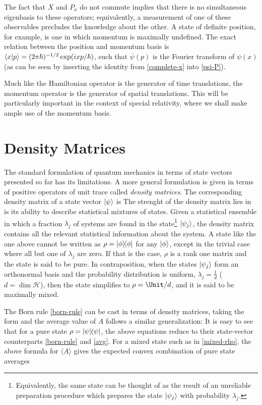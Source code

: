 \documentclass[12pt,a4paper,notitlepage]{report}
\begin{document}
The fact that $X$ and $P_x$ do not commute implies that there is no simultaneous eigenbasis to these operators; equivalently, a measurement of one of these observables precludes the knowledge about the other. A state of definite position, for example, is one in which momentum is maximally undefined. The exact relation between the position and momentum basis is $\bra{x}\ket{p} = (2\pi\hbar)^{-1/2} \exp(i x p/\hbar)$, such that $\overbar{\psi}(p)$ is the Fourier transform of $\psi(x)$ (as can be seen by inserting the identity from \eqref{complete-x} into \eqref{psi-P}).

Much like the Hamiltonian operator is the generator of time translations, the momentum operator is the generator of spatial translations. This will be particularly important in the context of special relativity, where we shall make ample use of the momentum basis.


\section{Density Matrices}

The standard formulation of quantum mechanics in terms of state vectors presented so far has its limitations. A more general formulation is given in terms of positive operators of unit trace called {\it density matrices}. The corresponding density matrix of a state vector $\ket{\psi}$ is
%
%
The strenght of the density matrix lies in is its ability to describe statistical mixtures of states.
Given a statistical ensemble in which a fraction $\lambda_j$ of systems are found in the state\footnote{Equivalently, the same state can be thought of as the result of an unreliable preparation procedure which prepares the state $\ket{\psi_j}$ with probability $\lambda_j$.} $\ket{\psi_j}$, the density matrix
%
%
contains all the relevant statistical information about the system. A state like the one above cannot be written as $\rho = \dyad{\phi}$ for any $\ket{\phi}$, except in the trivial case where all but one of $\lambda_j$ are zero. If that is the case, $\rho$ is a rank one matrix and the state is said to be pure. In contraposition, when the states $\ket{\psi_j}$ form an orthonormal basis and the probability distribution is uniform, $\lambda_j = \frac{1}{d}$ ($d=\dim\mathcal{H}$), then the state simplifies to $\rho = \Unit/d$, and it is said to be maximally mixed.

The Born rule \eqref{born-rule} can be cast in terms of density matrices, taking the form
%
%
and the average value of $A$ follows a similar generalization:
%
%
It is easy to see that for a pure state $\rho = \dyad{\psi}$, the above equations reduce to their state-vector counterparts \eqref{born-rule} and \eqref{avg}.
For a mixed state such as in \eqref{mixed-rho}, the above formula for $\langle A \rangle$ gives the expected convex combination of pure state averages
%
%
\end{document}
